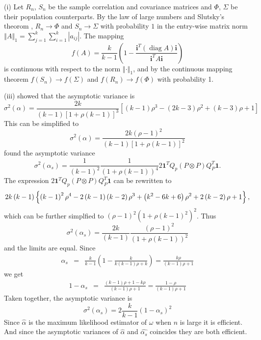 \documentclass{article}
\makeatletter
\theoremstyle{plain}
\theoremstyle{plain}
\theoremstyle{definition}
\theoremstyle{remark}
\theoremstyle{definition}
\theoremstyle{plain}
\theoremstyle{plain}
\theoremstyle{definition}
\newenvironment{proof}[1][\protect\proofname]{\par
	\normalfont\topsep6\p@\@plus6\p@\relax
	\trivlist
	\itemindent\parindent
	\item[\hskip\labelsep\scshape #1]\ignorespaces
}{%
	\endtrivlist\@endpefalse
}
\providecommand{\proofname}{Proof}
\DeclareMathOperator{\diag}{diag}
\makeatother
\begin{document}
\begin{proof}[Proof of Theorem \ref{thm:asymptotics}]\label{proof:asymptotics}
(i) Let $R_{n}$, $S_{n}$ be the sample correlation and covariance matrices
and $\Phi$, $\Sigma$ be their population counterparts. By the law
of large numbers and Slutsky's theorom \citep[][Lemma 2.8, p. 11]{Van_der_Vaart2000-qc}, $R_{n}\to\Phi$ and $S_{n}\to\Sigma$
with probability $1$ in the entry-wise matrix norm $\left\Vert A\right\Vert _{1}=\sum_{j=1}^{k}\sum_{i=1}^{k}\left|a_{ij}\right|$.
The mapping
\[
f\left(A\right)=\frac{k}{k-1}\left(1-\frac{\mathbf{i}^{T}(\diag A)\mathbf{i}}{\mathbf{i}^{T}A\mathbf{i}}\right)
\]
is continuous with respect to the norm $\left\Vert \cdot\right\Vert _{1}$,
and by the continuous mapping theorem \citep[][Theorem 2.3, p. 7]{Van_der_Vaart2000-qc}
$f\left(S_{n}\right)\to f\left(\Sigma\right)$ and $f\left(R_{n}\right)\to f\left(\Phi\right)$
with probability 1.

(iii) \citet[eq. 22]{Van_Zyl2000-si} showed that the asymptotic variance
is
\[
\sigma^{2}\left(\alpha\right)=\frac{2k}{\left(k-1\right)\left[1+\rho\left(k-1\right)\right]^{3}}\left[\left(k-1\right)\rho^{3}-\left(2k-3\right)\rho^{2}+\left(k-3\right)\rho+1\right]
\]
This can be simplified to
\[
\sigma^{2}\left(\alpha\right)=\frac{2k\left(\rho-1\right)^{2}}{\left(k-1\right)\left[1+\rho\left(k-1\right)\right]^{2}}
\]
\citet[equation 10]{hayashi2005note} found the asymptotic variance
\[
\sigma^{2}\left(\alpha_{s}\right)=\frac{1}{\left(k-1\right)^{2}}\frac{1}{\left(1+\rho\left(k-1\right)\right)^{4}}2\mathbf{1}^{T}Q_{p}\left(P\otimes P\right)Q_{P}^{T}\mathbf{1}.
\]
The expression $2\mathbf{1}^{T}Q_{p}\left(P\otimes P\right)Q_{P}^{T}\mathbf{1}$
can be rewritten to \citep[appendix 3]{hayashi2005note}
\[
2k\left(k-1\right)\left\{ \left(k-1\right)^{2}\rho^{4}-2\left(k-1\right)\left(k-2\right)\rho^{3}+\left(k^{2}-6k+6\right)\text{\ensuremath{\rho^{2}+2\left(k-2\right)\rho+1}}\right\} ,
\]
which can be further simplfied to $\left(\rho-1\right)^{2}\left(1+\rho\left(k-1\right)^{2}\right)^{2}$.
Thus
\[
\sigma^{2}\left(\alpha_{s}\right)=\frac{2k}{\left(k-1\right)}\frac{\left(\rho-1\right)^{2}}{\left(1+\rho\left(k-1\right)\right)^{2}}
\]
and the limits are equal.
Since
\begin{eqnarray*}
\alpha_{s} & = & \frac{k}{k-1}\left(1-\frac{k}{k\left(k-1\right)\rho+k}\right) = \frac{k\rho}{\left(k-1\right)\rho+1}
\end{eqnarray*}
we get
\begin{eqnarray*}
1-\alpha_{s} & = & \frac{\left(k-1\right)\rho+1-k\rho}{\left(k-1\right)\rho+1} = \frac{1-\rho}{\left(k-1\right)\rho+1}
\end{eqnarray*}
Taken together, the asymptotic variance is
\[
\sigma^{2}\left(\alpha_{s}\right)=2\frac{k}{k-1}\left(1-\alpha_{s}\right)^{2}
\]
Since $\hat{\alpha}$ is the maximum likelihood estimator of $\omega$
when $n$ is large it is efficient. And since the asymptotic variances
of $\hat{\alpha}$ and $\hat{\alpha_{s}}$ coincides they
are both efficient.
\end{proof}
\end{document}
